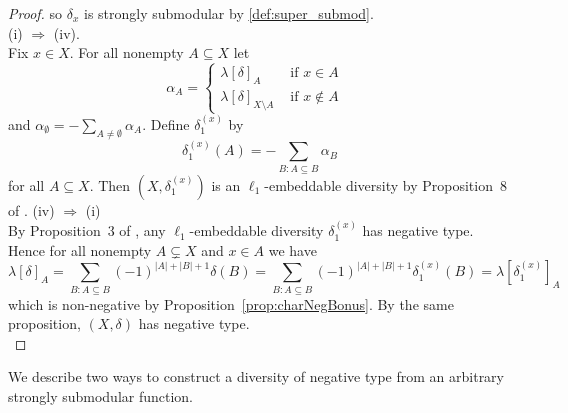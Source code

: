 \documentclass{article}
\theoremstyle{plain}
\theoremstyle{definition}
\begin{document}
\begin{proof}
so $\delta_x$ is strongly submodular by \eqref{def:super_submod}. \\
(i) $\Rightarrow$ (iv).\\
Fix $x \in X$. For all nonempty $A \subseteq X$ let
\[\alpha_A = \begin{cases} \lambda[\delta]_A & \mbox{ if $x \in A$ } \\ \lambda[\delta]_{X \setminus A} & \mbox{ if $x \not \in A$ } \end{cases}\]
and $\alpha_\emptyset = -\sum_{A \neq \emptyset} \alpha_A$. 
Define $\delta_1^{(x)}$ by \[\delta_1^{(x)} (A) = -\sum_{B:A \subseteq B} \alpha_B\]
for all $A \subseteq X$. Then $(X,\delta_1^{(x)})$ is an $\ell_1$-embeddable diversity by Proposition~8 of \cite{WuBryantEtal19}. 
(iv) $\Rightarrow$  (i)\\
By Proposition~3 of \cite{WuBryantEtal19}, any $\ell_1$-embeddable diversity $\delta^{(x)}_1$ has negative type. Hence for all nonempty $A \subsetneq X$ and $x \in A$ we have 
\[\lambda[\delta]_A = \sum_{B:A \subseteq B}(-1)^{|A|+|B|+1} \delta(B) = \sum_{B:A \subseteq B}(-1)^{|A|+|B|+1} \delta_1^{(x)}(B) = \lambda[\delta^{(x)}_1]_A \]
which is non-negative by Proposition~\ref{prop:charNegBonus}. By the same proposition, $(X,\delta)$ has negative type. \\

\end{proof}

We describe two ways to construct a diversity of negative type from an arbitrary strongly submodular function.
\end{document}
